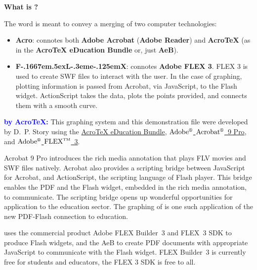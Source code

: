 \documentclass{article}
\begin{document}
\maketitle

\parskip6pt
\begin{center}
    \large\bfseries\color{blue} What is {\AcroFLeX}?
\end{center}

The word \textbf{\AcroFLeX} is meant to convey a merging of two computer technologies:
 \begin{itemize}
 \item \textbf{Acro}: connotes both \textbf{Adobe Acrobat} (\textbf{Adobe Reader})
  and \textbf{{Acro\negthinspace\TeX}} (as in the
 \textbf{{Acro\negthinspace\TeX} eDucation Bundle} or, just \textbf{AeB}).
 \item \textbf{F\kern-.1667em\lower.5ex\hbox{L}\kern-.3eme\kern-.125emX\@}: connotes
       \textbf{Adobe FLEX 3}. FLEX 3 is used to create SWF files to interact with the user.
       In the case of graphing, plotting information is passed from Acrobat, via JavaScript,
       to the Flash widget. ActionScript takes the data, plots the points provided, and
       connects them with a smooth curve.
 \end{itemize}

\textbf{\textcolor{blue}{{\AcroFLeX} by Acro\!\TeX:}} This graphing
system and this demonstration file were developed by D.~P. Story
using the \href{http://www.ctan.org/pkg/acrotex}{{Acro\!\TeX} eDucation
Bundle}, \href{http://www.adobe.com/products/acrobat/}
{$\text{Adobe}^{\text{\tiny\circledR}}$
$\text{Acrobat}^{\text{\tiny\circledR}}$~9 Pro}, and
\href{http://www.adobe.com/products/flex/}{$\text{Adobe}^{\text{\tiny\circledR}}$
$\text{FLEX}^{\text{\tiny TM}}$~3}.

Acrobat 9 Pro introduces the rich media annotation that plays FLV
movies and SWF files natively. Acrobat also provides a scripting
bridge between JavaScript for Acrobat, and ActionScript, the
scripting language of Flash player. This bridge enables the PDF and
the Flash widget, embedded in the rich media annotation, to
communicate. The scripting bridge opens up wonderful opportunities
for application to the education sector. The graphing of {\AcroFLeX}
is one such application of the new PDF-Flash connection to
education.

\textbf{{\AcroFLeX}} uses the commercial product Adobe FLEX
Builder~3 and   FLEX~3 SDK to produce Flash widgets, and the AeB to
create PDF documents with appropriate JavaScript to communicate with
the Flash widget. FLEX Builder~3 is currently free for students and
educators, the FLEX 3 SDK is free to all.
\end{document}
